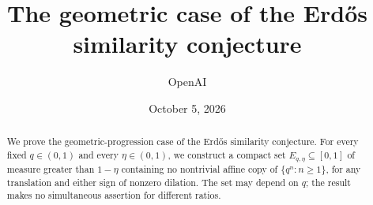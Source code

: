 \documentclass[11pt]{article}
\title{The geometric case of the Erd\H{o}s similarity conjecture}
\author{OpenAI}
\date{October 5, 2026}
\theoremstyle{definition}
\theoremstyle{remark}
\newcommand{\1}{\mathbf 1}
\numberwithin{equation}{section}
\begin{document}
\maketitle
\begin{abstract}
We prove the geometric-progression case of the Erd\H{o}s similarity
conjecture. For every fixed $q\in(0,1)$ and every $\eta\in(0,1)$, we
construct a compact set $E_{q,\eta}\subseteq[0,1]$ of measure greater
than $1-\eta$ containing no nontrivial affine copy of
$\{q^n:n\ge1\}$, for any translation and either sign of nonzero dilation.
The set may depend on $q$; the result makes no simultaneous assertion
for different ratios.
\end{abstract}






\begingroup
\raggedright

\endgroup
\end{document}
